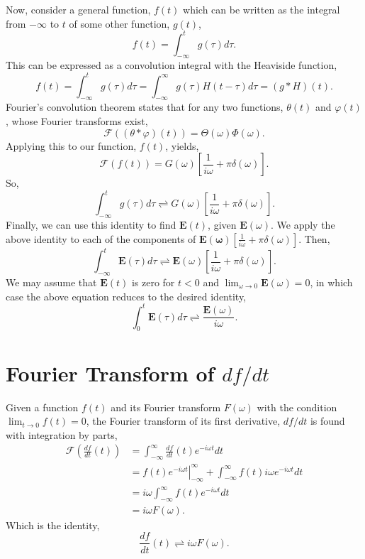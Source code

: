 \documentclass[12pt]{article}
\begin{document}
Now, consider a general function, $f(t)$ which can be written as the integral from $-\infty$ to $t$ of some other function, $g(t)$,
\begin{equation}
f(t)=\int_{-\infty}^{t}g(\tau)d\tau.
\end{equation}
This can be expressed as a convolution integral with the Heaviside function,
\begin{equation}
f(t)=\int_{-\infty}^{t}g(\tau)d\tau = \int_{-\infty}^{\infty}g(\tau)H(t-\tau)d\tau=(g*H)(t).
\end{equation}
Fourier's convolution theorem states that for any two functions, $\theta(t)$ and $\varphi(t)$, whose Fourier transforms exist,
\begin{equation}
\mathcal{F}((\theta*\varphi)(t)) = \Theta(\omega)\varPhi(\omega).
\end{equation}
Applying this to our function, $f(t)$, yields,
\begin{equation}
\mathcal{F}(f(t)) = G(\omega)\left[\frac{1}{i\omega}+\pi\delta(\omega)\right].
\end{equation}
So,
\begin{equation}
\int_{-\infty}^{t}g(\tau)d\tau\rightleftharpoons G(\omega)\left[\frac{1}{i\omega}+\pi\delta(\omega)\right].
\end{equation}
Finally, we can use this identity to find $\mathbf{E}(t)$, given $\mathbf{E}(\omega)$. We apply the above identity to each of the components of $\mathbf{E(\omega)}\left[\frac{1}{i\omega}+\pi\delta(\omega)\right]$. Then,
\begin{equation}
\int_{-\infty}^{t}\mathbf{E}(\tau)d\tau\rightleftharpoons \mathbf{E}(\omega)\left[\frac{1}{i\omega}+\pi\delta(\omega)\right].
\end{equation}
We may assume that $\mathbf{E}(t)$ is zero for $t<0$ and $\lim_{\omega\rightarrow 0}\mathbf{E}(\omega)=0$, in which case the above equation reduces to the desired identity,
\begin{equation}
\int_0^t\mathbf{E}(\tau)d\tau\rightleftharpoons \frac{\mathbf{E}(\omega)}{i\omega}.
\end{equation}
\newpage
\section{Fourier Transform of $df/dt$}
\label{ap:fourier2}
Given a function $f(t)$ and its Fourier transform $F(\omega)$ with the condition $\lim_{t\rightarrow 0}f(t) = 0$, the Fourier transform of its first derivative, $df/dt$ is found with integration by parts,
\begin{align*}
\mathcal{F}\left(\frac{df}{dt}(t)\right) &= \int_{-\infty}^{\infty}\frac{df}{dt}(t)e^{-i\omega t}dt \\
& = \left.f(t)e^{-i\omega t}\right|_{-\infty}^{\infty} + \int_{-\infty}^{\infty}f(t)i\omega e^{-i\omega t}dt\\
& = i\omega \int_{-\infty}^{\infty}f(t)e^{-i\omega t}dt\\
& = i\omega F(\omega).
\end{align*}
Which is the identity,
\begin{equation}
\frac{df}{dt}(t) \rightleftharpoons i\omega F(\omega).
\end{equation}
\end{document}
